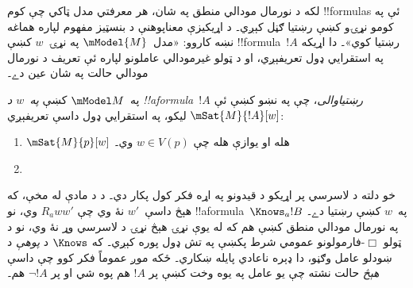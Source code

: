 \documentclass[../../../include/open-logic-section]{subfiles}
\begin{document}


لکه د نورمال مودالي منطق په شان، هر معرفتي مدل ټاکي چې کوم !!{formula}s
ئې په کومو نړۍو کښې رښتيا ګڼل کېږي۔ د اړيکيزې معناپوهنې د بنسټيز
مفهوم لپاره هماغه نښه کاروو: «مدل~$\mModel{M}$ په نړۍ~$w$ کښې
!!{formula}~$!A$ رښتيا کوي»۔ دا اړيکه په استقرايي ډول تعريفېږي، او د
ټولو غيرمودالي عاملونو لپاره ئې تعريف د نورمال مودالي حالت په شان عين دے۔

\begin{defn}
  په~$\mModel M$ کښې \emph{په~$w$ د !!a{formula}~$!A$ رښتياوالی}،
  چې په نښو کښې ئې $\mSat{M}{!A}[w]$ ليکو، په استقرايي ډول داسې تعريفېږي:
  \begin{enumerate}
  \item $\mSat{M}{p}[w]$ هله او يوازې هله چې $w \in V(p)$ وي۔
  \item{}
  \end{enumerate}
\end{defn}

خو دلته د لاسرسي پر اړيکو د قيدونو په اړه فکر کول پکار دي۔ د
 د مادې له مخې، که هېڅ داسې~$w'$
نۀ وي چې $R_a ww'$ وي، نو !!a{formula}~$\Knows_a !B$ په~$w$
کښې رښتيا دے۔ په نورمال مودالي منطق کښې هم که له يوې نړۍ هېڅ
نړۍ د لاسرسي وړ نۀ وي، نو د ټولو $\Box$-فارمولونو عمومي شرط
پکښې په تش ډول پوره کېږي۔ که $\Knows$ د \emph{پوهې} د ښودلو عامل وګڼو، دا ډېره ناعادي
پايله ښکاري۔ ځکه موږ عموماً فکر کوو چې داسې \emph{هېڅ} حالت نشته
چې يو عامل په يوه وخت کښې پر $!A$ هم پوه شي او پر $\lnot !A$ هم۔
\end{document}
